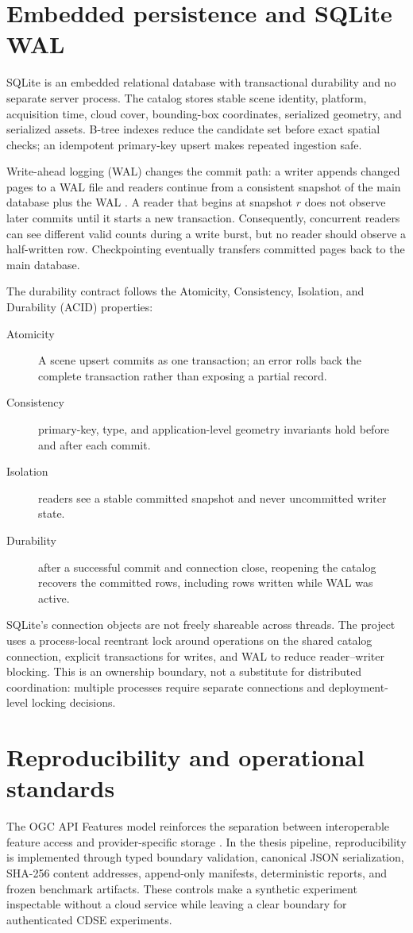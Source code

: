 \section{Embedded persistence and SQLite WAL}

SQLite is an embedded relational database with transactional durability and no separate server
process. The catalog stores stable scene identity, platform, acquisition time, cloud cover,
bounding-box coordinates, serialized geometry, and serialized assets. B-tree indexes reduce the
candidate set before exact spatial checks; an idempotent primary-key upsert makes repeated
ingestion safe.

Write-ahead logging (WAL) changes the commit path: a writer appends changed pages to a WAL file
and readers continue from a consistent snapshot of the main database plus the WAL
\cite{sqlite-wal}. A reader that begins at snapshot \(r\) does not observe later commits until it
starts a new transaction. Consequently, concurrent readers can see different valid counts during a
write burst, but no reader should observe a half-written row. Checkpointing eventually transfers
committed pages back to the main database.

The durability contract follows the Atomicity, Consistency, Isolation, and Durability (ACID)
properties:
\begin{description}
\item[Atomicity] A scene upsert commits as one transaction; an error rolls back the complete
transaction rather than exposing a partial record.
\item[Consistency] primary-key, type, and application-level geometry invariants hold before and
after each commit.
\item[Isolation] readers see a stable committed snapshot and never uncommitted writer state.
\item[Durability] after a successful commit and connection close, reopening the catalog recovers
the committed rows, including rows written while WAL was active.
\end{description}

SQLite's connection objects are not freely shareable across threads. The project uses a
process-local reentrant lock around operations on the shared catalog connection, explicit
transactions for writes, and WAL to reduce reader--writer blocking. This is an ownership boundary,
not a substitute for distributed coordination: multiple processes require separate connections and
deployment-level locking decisions.

\section{Reproducibility and operational standards}

The OGC API Features model reinforces the separation between interoperable feature access and
provider-specific storage \cite{ogc-api-features}. In the thesis pipeline, reproducibility is
implemented through typed boundary validation, canonical JSON serialization, SHA-256 content
addresses, append-only manifests, deterministic reports, and frozen benchmark artifacts. These
controls make a synthetic experiment inspectable without a cloud service while leaving a clear
boundary for authenticated CDSE experiments.
